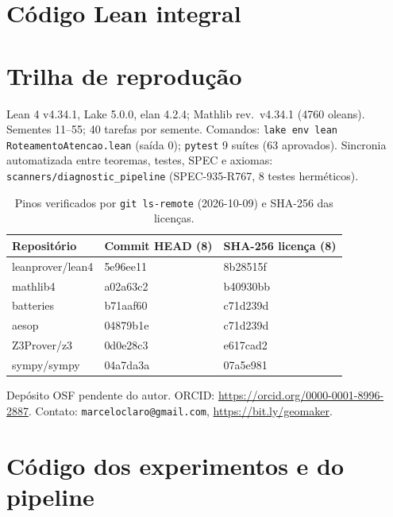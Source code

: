 \appendix
\chapter{Código Lean integral}
\label{ap:lean}

\chapter{Trilha de reprodução}
Lean 4 v4.34.1, Lake 5.0.0, elan 4.2.4; Mathlib rev.\ v4.34.1 (4760 oleans). Sementes 11--55; 40 tarefas por semente. Comandos: \texttt{lake env lean RoteamentoAtencao.lean} (saída 0); \texttt{pytest} 9 suítes (63 aprovados). Sincronia automatizada entre teoremas, testes, SPEC e axiomas: \texttt{scanners/diagnostic\_pipeline} (SPEC-935-R767, 8 testes herméticos).
\begin{table}[h]
\centering
\caption{Pinos verificados por \texttt{git ls-remote} (2026-10-09) e SHA-256 das licenças.}
\label{tab:pins}
\begin{tabular}{lll}
\toprule
Repositório & Commit HEAD (8) & SHA-256 licença (8) \\
\midrule
leanprover/lean4 & 5e96ee11 & 8b28515f \\
mathlib4 & a02a63c2 & b40930bb \\
batteries & b71aaf60 & c71d239d \\
aesop & 04879b1e & c71d239d \\
Z3Prover/z3 & 0d0e28c3 & e617cad2 \\
sympy/sympy & 04a7da3a & 07a5e981 \\
\bottomrule
\end{tabular}
\end{table}
Depósito OSF pendente do autor. ORCID: \url{https://orcid.org/0000-0001-8996-2887}. Contato: \texttt{marceloclaro@gmail.com}, \url{https://bit.ly/geomaker}.
\chapter{Código dos experimentos e do pipeline}
\label{ap:codigo}








